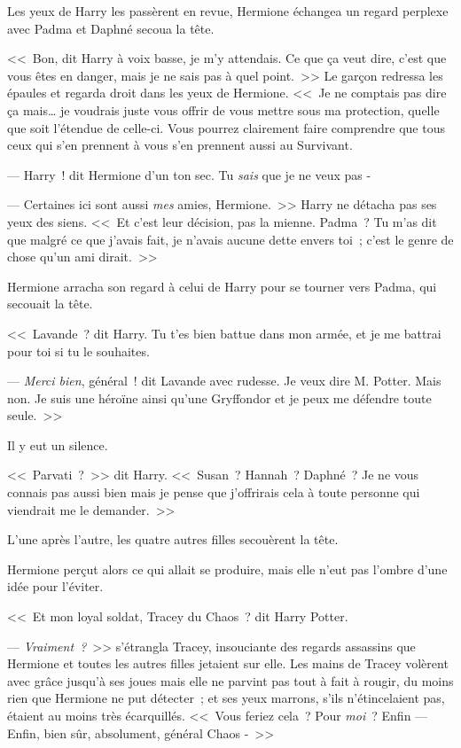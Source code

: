 Les yeux de Harry les passèrent en revue, Hermione échangea un regard perplexe avec Padma et Daphné secoua la tête.

<<~Bon, dit Harry à voix basse, je m'y attendais. Ce que ça veut dire, c'est que vous êtes en danger, mais je ne sais pas à quel point.~>> Le garçon redressa les épaules et regarda droit dans les yeux de Hermione. <<~Je ne comptais pas dire ça mais… je voudrais juste vous offrir de vous mettre sous ma protection, quelle que soit l'étendue de celle-ci. Vous pourrez clairement faire comprendre que tous ceux qui s'en prennent à vous s'en prennent aussi au Survivant.

--- Harry~! dit Hermione d'un ton sec. Tu \emph{sais} que je ne veux pas -

--- Certaines ici sont aussi \emph{mes} amies, Hermione.~>> Harry ne détacha pas ses yeux des siens. <<~Et c'est leur décision, pas la mienne. Padma~? Tu m'as dit que malgré ce que j'avais fait, je n'avais aucune dette envers toi~; c'est le genre de chose qu'un ami dirait.~>>

Hermione arracha son regard à celui de Harry pour se tourner vers Padma, qui secouait la tête.

<<~Lavande~? dit Harry. Tu t'es bien battue dans mon armée, et je me battrai pour toi si tu le souhaites.

--- \emph{Merci bien}, général~! dit Lavande avec rudesse. Je veux dire M. Potter. Mais non. Je suis une héroïne ainsi qu'une Gryffondor et je peux me défendre toute seule.~>>

Il y eut un silence.

<<~Parvati~?~>> dit Harry. <<~Susan~? Hannah~? Daphné~? Je ne vous connais pas aussi bien mais je pense que j'offrirais cela à toute personne qui viendrait me le demander.~>>

L'une après l'autre, les quatre autres filles secouèrent la tête.

Hermione perçut alors ce qui allait se produire, mais elle n'eut pas l'ombre d'une idée pour l'éviter.

<<~Et mon loyal soldat, Tracey du Chaos~? dit Harry Potter.

--- \emph{Vraiment~?}~>> s'étrangla Tracey, insouciante des regards assassins que Hermione et toutes les autres filles jetaient sur elle. Les mains de Tracey volèrent avec grâce jusqu'à ses joues mais elle ne parvint pas tout à fait à rougir, du moins rien que Hermione ne put détecter~; et ses yeux marrons, s'ils n'étincelaient pas, étaient au moins très écarquillés. <<~Vous feriez cela~? Pour \emph{moi}~? Enfin — Enfin, bien sûr, absolument, général Chaos -~>>


